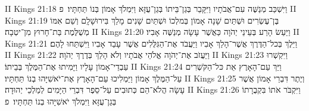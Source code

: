 II Kings 21:18	וַיִּשְׁכַּב מְנַשֶּׁה עִם־אֲבֹתָיו וַיִּקָּבֵר בְּגַן־בֵּיתוֹ בְּגַן־עֻזָּא וַיִּמְלֹךְ אָמוֹן בְּנוֹ תַּחְתָּיו׃ {פ}
II Kings 21:19	בֶּן־עֶשְׂרִים וּשְׁתַּיִם שָׁנָה אָמוֹן בְּמלְכוֹ וּשְׁתַּיִם שָׁנִים מָלַךְ בִּירוּשָׁלָ͏ִם וְשֵׁם אִמּוֹ מְשֻׁלֶּמֶת בַּת־חָרוּץ מִן־יטְבָה׃
II Kings 21:20	וַיַּעַשׂ הָרַע בְּעֵינֵי יְהֹוָה כַּאֲשֶׁר עָשָׂה מְנַשֶּׁה אָבִיו׃
II Kings 21:21	וַיֵּלֶךְ בְּכל־הַדֶּרֶךְ אֲשֶׁר־הָלַךְ אָבִיו וַיַּעֲבֹד אֶת־הַגִּלֻּלִים אֲשֶׁר עָבַד אָבִיו וַיִּשְׁתַּחוּ לָהֶם׃
II Kings 21:22	וַיַּעֲזֹב אֶת־יְהֹוָה אֱלֹהֵי אֲבֹתָיו וְלֹא הָלַךְ בְּדֶרֶךְ יְהֹוָה׃
II Kings 21:23	וַיִּקְשְׁרוּ עַבְדֵי־אָמוֹן עָלָיו וַיָּמִיתוּ אֶת־הַמֶּלֶךְ בְּבֵיתוֹ׃
II Kings 21:24	וַיַּךְ עַם־הָאָרֶץ אֵת כּל־הַקֹּשְׁרִים עַל־הַמֶּלֶךְ אָמוֹן וַיַּמְלִיכוּ עַם־הָאָרֶץ אֶת־יֹאשִׁיָּהוּ בְנוֹ תַּחְתָּיו׃
II Kings 21:25	וְיֶתֶר דִּבְרֵי אָמוֹן אֲשֶׁר עָשָׂה הֲלֹא־הֵם כְּתוּבִים עַל־סֵפֶר דִּבְרֵי הַיָּמִים לְמַלְכֵי יְהוּדָה׃
II Kings 21:26	וַיִּקְבֹּר אֹתוֹ בִּקְבֻרָתוֹ בְּגַן־עֻזָּא וַיִּמְלֹךְ יֹאשִׁיָּהוּ בְנוֹ תַּחְתָּיו׃ {פ}
